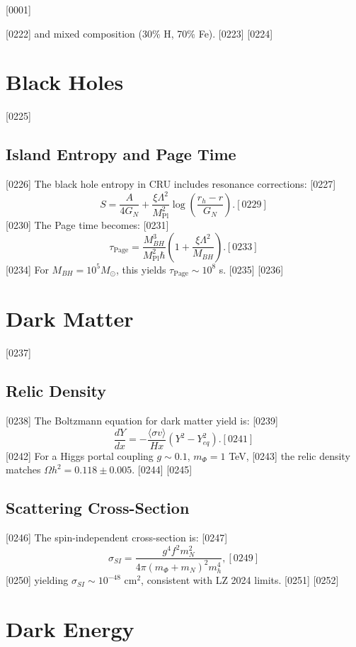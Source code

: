 [0001] \documentclass[12pt]{report}
[0002] \usepackage[utf8]{inputenc}
\begin{document}
[0222] and mixed composition (30\% H, 70\% Fe).
[0223] 
[0224] \chapter{Black Holes}
[0225] \section{Island Entropy and Page Time}
[0226] The black hole entropy in CRU includes resonance corrections:
[0227] \begin{equation}
[0228] S = \frac{A}{4 G_N} + \frac{\xi \Lambda^2}{M_{\text{Pl}}^2} 
\log\left(\frac{r_h - r}{G_N}\right).
[0229] \end{equation}
[0230] The Page time becomes:
[0231] \begin{equation}
[0232] \tau_{\text{Page}} = \frac{M_{BH}^3}{M_{\text{Pl}}^2 \hbar} 
\left(1 + \frac{\xi \Lambda^2}{M_{BH}}\right).
[0233] \end{equation}
[0234] For $M_{BH} = 10^5 M_\odot$, this yields $\tau_{\text{Page}} \sim 10^8$ s.
[0235] 
[0236] \chapter{Dark Matter}
[0237] \section{Relic Density}
[0238] The Boltzmann equation for dark matter yield is:
[0239] \begin{equation}
[0240] \frac{dY}{dx} = - \frac{\langle \sigma v \rangle}{Hx} (Y^2 - Y_{eq}^2).
[0241] \end{equation}
[0242] For a Higgs portal coupling $g \sim 0.1$, $m_\Phi = 1$ TeV, 
[0243] the relic density matches $\Omega h^2 = 0.118 \pm 0.005$.
[0244] 
[0245] \section{Scattering Cross-Section}
[0246] The spin-independent cross-section is:
[0247] \begin{equation}
[0248] \sigma_{SI} = \frac{g^4 f^2 m_N^2}{4 \pi (m_\Phi + m_N)^2 m_h^4},
[0249] \end{equation}
[0250] yielding $\sigma_{SI} \sim 10^{-48}$ cm$^2$, consistent with LZ 2024 limits.
[0251] 
[0252] \chapter{Dark Energy}
\end{document}
